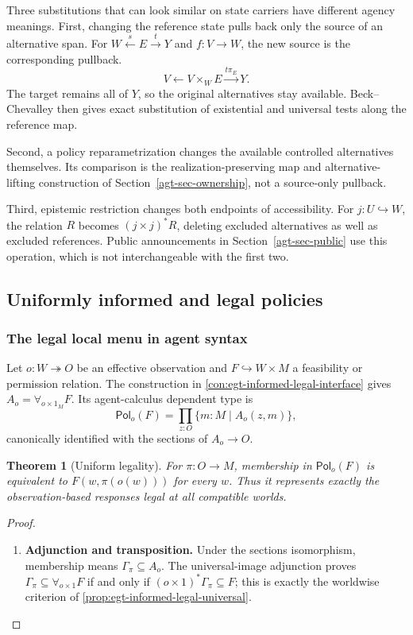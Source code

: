 \documentclass[11pt,a4paper]{article}
\numberwithin{equation}{section}
\newtheorem{theorem}{Theorem}[section]
\theoremstyle{definition}
\theoremstyle{remark}
\theoremstyle{plain}
\providecommand{\Pol}{\mathsf{Pol}}
\begin{document}
Three substitutions that can look similar on state carriers have
different agency meanings. First, changing the reference state pulls back
only the source of an alternative span. For
$W\xleftarrow{s}E\xrightarrow{t}Y$ and $f:V\to W$, the new
source is the corresponding pullback.
\[
 V\xleftarrow{}V\times_WE\xrightarrow{t\pi_E}Y.
\]
The target remains all of $Y$, so the original alternatives stay
available. Beck--Chevalley then gives exact substitution of existential
and universal tests along the reference map.

Second, a policy reparametrization changes the available controlled
alternatives themselves. Its comparison is the realization-preserving
map and alternative-lifting construction of
Section~\ref{agt-sec-ownership}, not a source-only pullback.

Third, epistemic restriction changes both endpoints of
accessibility. For $j:U\hookrightarrow W$, the relation $R$ becomes
$(j\times j)^*R$, deleting excluded alternatives as well as excluded
references. Public announcements in Section~\ref{agt-sec-public}
use this operation, which is not interchangeable with the first two.

\subsection{Uniformly informed and legal policies}
\label{agt-sec-uniform}

\subsubsection{The legal local menu in agent syntax}

Let $o:W\twoheadrightarrow O$ be an effective observation and
$F\hookrightarrow W\times M$ a feasibility or permission relation.
The construction in \cref{con:egt-informed-legal-interface} gives
$A_o=\forall_{o\times1_M}F$. Its agent-calculus dependent type is
\begin{equation}
 \Pol_o(F)=\prod_{z:O}\{m:M\mid A_o(z,m)\},
 \label{agt-eq-uniform-policies}
\end{equation}
canonically identified with the sections of $A_o\to O$.

\begin{theorem}[Uniform legality]
\label{agt-thm-uniform}
For $\pi:O\to M$, membership in $\Pol_o(F)$ is equivalent to
$F(w,\pi(o(w)))$ for every $w$. Thus it represents exactly the
observation-based responses legal at all compatible worlds.
\end{theorem}
\begin{proof}
\leavevmode
\begin{enumerate}[label=\textup{(\arabic*)},leftmargin=*,itemsep=4pt,topsep=3pt]
  \item \textbf{Adjunction and transposition.} Under the sections isomorphism, membership means
$\Gamma_\pi\subseteq A_o$. The universal-image adjunction proves
$\Gamma_\pi\subseteq\forall_{o\times1}F$ if and only if
$(o\times1)^*\Gamma_\pi\subseteq F$; this is exactly the worldwise
criterion of \cref{prop:egt-informed-legal-universal}.
\end{enumerate}
\end{proof}
\end{document}

